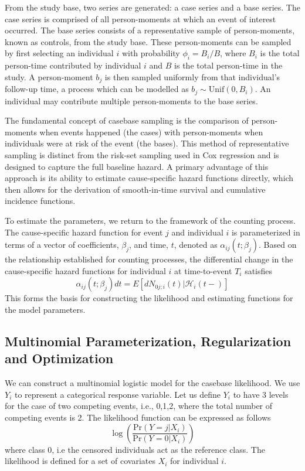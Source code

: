 \documentclass[AMA,Times1COL]{WileyNJDv5} %
\begin{document}
From the study base, two series are generated: a case series and a base series. The case series is comprised of all person-moments at which an event of interest occurred. The base series consists of a representative sample of person-moments, known as controls, from the study base. These person-moments can be sampled by first selecting an individual $i$ with probability $\phi_{i}=B_{i}/B$, where $B_{i}$ is the total person-time contributed by individual $i$ and $B$ is the total person-time in the study. A person-moment $b_j$ is then sampled uniformly from that individual's follow-up time, a process which can be modelled as $b_{j}\sim \text{Unif}(0,B_{i})$. An individual may contribute multiple person-moments to the base series.

The fundamental concept of casebase sampling is the comparison of person-moments when events happened (the cases) with person-moments when individuals were at risk of the event (the bases). This method of representative sampling is distinct from the risk-set sampling used in Cox regression and is designed to capture the full baseline hazard. A primary advantage of this approach is its ability to estimate cause-specific hazard functions directly, which then allows for the derivation of smooth-in-time survival and cumulative incidence functions.

To estimate the parameters, we return to the framework of the counting process. The cause-specific hazard function for event $j$ and individual $i$ is parameterized in terms of a vector of coefficients, $\beta_{j}$, and time, $t$, denoted as $\alpha_{ij}(t;\beta_{j})$. Based on the relationship established for counting processes, the differential change in the cause-specific hazard functions for individual $i$ at time-to-event $T_i$ satisfies
$$\alpha_{ij}(t;\beta_{j})dt=E[dN_{0j;i}(t)|\mathcal{H}_{i}(t-)]$$
This forms the basis for constructing the likelihood and estimating functions for the model parameters.

\subsection{Multinomial Parameterization, Regularization and Optimization}

We can construct a multinomial logistic model for the casebase likelihood. We use $Y_{i}$ to represent a categorical response variable. Let us define $Y_{i}$ to have 3 levels for the case of two competing events, i.e., {0,1,2}, where the total number of competing events is 2. The likelihood function can be expressed as follows
$$\log\left(\frac{\text{Pr}(Y=j|X_i)}{\text{Pr}(Y=0|X_i)}\right)$$
where class 0, i.e the censored individuals act as the reference class. The likelihood is defined for a set of covariates $X_{i}$ for individual $i$.
\end{document}
